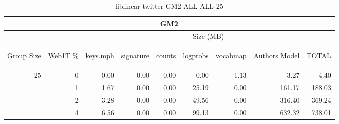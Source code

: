 \begin{center}
\begin{table}[htbp] 
 \begin{center}
\begin{tabular}{ | r | r | r | r | r | r | r | r | r |}
\hline
\multicolumn{9}{|c|}{GM2}\\
\hline
 & & \multicolumn{7}{|c|}{Size (MB)}\\ \cline{3-9}
\begin{sideways}Group Size\end{sideways} & \begin{sideways}Web1T \% \end{sideways} & \begin{sideways}keys.mph\end{sideways} & \begin{sideways}signature\end{sideways} & \begin{sideways}counts\end{sideways} & \begin{sideways}logprobs\end{sideways} & \begin{sideways}vocabmap\end{sideways} & \begin{sideways}Authors Model \end{sideways} & \begin{sideways}TOTAL\end{sideways}\\
\hline
\multirow{3}{*}{25}
 & 0 & 0.00 & 0.00 & 0.00 & 0.00 & 1.13 & 3.27 & 4.40\\ \cline{2-9}
 & 1 & 1.67 & 0.00 & 0.00 & 25.19 & 0.00 & 161.17 & 188.03\\ \cline{2-9}
 & 2 & 3.28 & 0.00 & 0.00 & 49.56 & 0.00 & 316.40 & 369.24\\ \cline{2-9}
 & 4 & 6.56 & 0.00 & 0.00 & 99.13 & 0.00 & 632.32 & 738.01\\ \cline{2-9}
\hline
\end{tabular}
\caption{liblinear-twitter-GM2-ALL-ALL-25}
\label{table:liblinear-twitter-GM2-ALL-ALL-25}
\end{center}
 \end{table}
\end{center}

